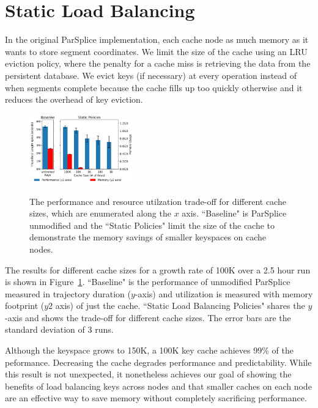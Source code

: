 \section{Static Load Balancing}
\label{sec:static-load-balancing}

In the original ParSplice implementation, each cache node as much memory as it
wants to store segment coordinates. We limit the size of the cache using an LRU
eviction policy, where the penalty for a cache miss is retrieving the data from
the persistent database.  We evict keys (if necessary) at every operation
instead of when segments complete because the cache fills up too quickly
otherwise and it reduces the overhead of key eviction.

\begin{figure}[t]
  \noindent\includegraphics[width=0.4\textwidth]{figures/methodology-tradeoff.png}\\
  \caption{The performance and resource utilzation trade-off for different
  cache sizes, which are enumerated along the \(x\) axis. ``Baseline" is
  ParSplice unmodified and the ``Static  Policies" limit the size of the
  cache to demonstrate the memory savings of smaller keyspaces on cache nodes.
  \label{fig:methodology-tradeoff}}
\end{figure}

The results for different cache sizes for a growth rate of 100K over a 2.5 hour
run is shown in Figure~\ref{fig:methodology-tradeoff}.  ``Baseline" is the
performance of unmodified ParSplice  measured in trajectory duration
(\(y\)-axis) and utilization is measured with memory footprint (\(y2\) axis) of
just the cache.  ``Static Load Balancing Policies" shares the \(y\)-axis and
shows the trade-off for different cache sizes. The error bars are the standard
deviation of 3 runs. 

Although the keyspace grows to 150K, a 100K key cache achieves 99\% of the
peformance. Decreasing the cache degrades performance and predictability.
While this result is not unexpected, it nonetheless achieves our goal of
showing the benefits of load balancing keys across nodes and that smaller
caches on each node are an effective way to save memory without completely
sacrificing performance.
